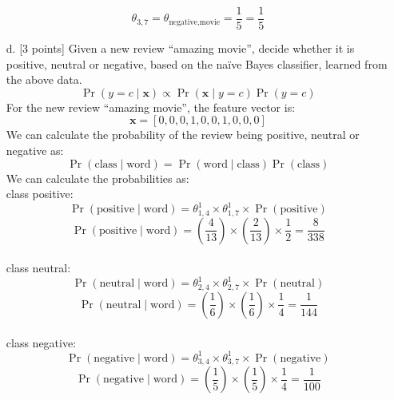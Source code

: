\documentclass[a3paper,12pt]{extarticle} %
\begin{document}
\begin{enumerate}
\[    \]
    \[
    \theta_{3,7} = \theta_{\text{negative}, \text{movie}} = \frac{1}{5} = \frac{1}{5}
    \]
    \item[d.] [3 points] Given a new review ``amazing movie'', decide whether it is positive, neutral or negative, based on the na\"ive Bayes classifier, learned from the above data.
    \[
    \Pr(y = c \mid \mathbf{x}) \propto \Pr(\mathbf{x} \mid y = c) \Pr(y = c)
    \]
    For the new review ``amazing movie'', the feature vector is:
    \[
    \mathbf{x} = [0, 0, 0, 1, 0, 0, 1, 0, 0, 0]
    \]
    We can calculate the probability of the review being positive, neutral or negative as:
    \[
        \Pr(\text{class} \mid \text{word} ) = \Pr(\text{word} \mid \text{class}) \Pr(\text{class})
    \]
    We can calculate the probabilities as:
    \\ class positive:
    \[
    \Pr(\text{positive} \mid \text{word} ) = \theta_{1,4}^{1} \times \theta_{1,7}^{1} \times \Pr(\text{positive})
    \]
    \[
    \Pr(\text{positive} \mid \text{word} ) = \left( \frac{4}{13} \right) \times \left( \frac{2}{13} \right) \times \frac{1}{2} = \frac{8}{338}
    \]
    \\ class neutral:
    \[
    \Pr(\text{neutral} \mid \text{word} ) = \theta_{2,4}^{1} \times \theta_{2,7}^{1} \times \Pr(\text{neutral})
    \]
    \[
    \Pr(\text{neutral} \mid \text{word} ) = \left( \frac{1}{6} \right) \times \left( \frac{1}{6} \right) \times \frac{1}{4} = \frac{1}{144}
    \]
    \\ class negative:
    \[
    \Pr(\text{negative} \mid \text{word} ) = \theta_{3,4}^{1} \times \theta_{3,7}^{1} \times \Pr(\text{negative})
    \]
    \[
    \Pr(\text{negative} \mid \text{word} ) = \left( \frac{1}{5} \right) \times \left( \frac{1}{5} \right) \times \frac{1}{4} = \frac{1}{100}
    \]


\end{enumerate}
\end{document}
